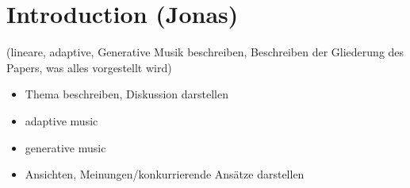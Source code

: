 \section{Introduction (Jonas)}
(lineare, adaptive, Generative Musik beschreiben, Beschreiben der Gliederung des Papers, was alles vorgestellt wird)
\begin{itemize}
    \item Thema beschreiben, Diskussion darstellen
    \item adaptive music
    \item generative music
    \item Ansichten, Meinungen/konkurrierende Ansätze darstellen

\end{itemize}